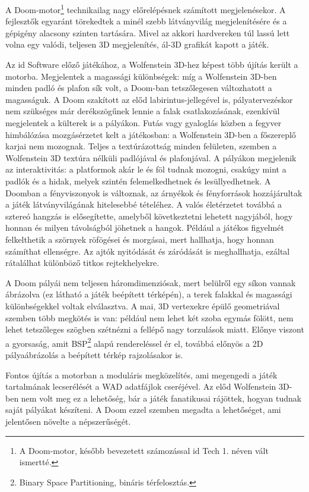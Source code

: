 \documentclass{thesis-ekf}
\theoremstyle{definition}
\theoremstyle{remark}
\begin{document}
A Doom-motor\footnote{A Doom-motor, később bevezetett számozással id Tech 1.
néven vált ismertté.} technikailag nagy előrelépésnek számított megjelenésekor.
A fejlesztők egyaránt törekedtek a minél szebb látványvilág megjelenítésére és a
gépigény alacsony szinten tartására. Mivel az akkori hardvereken túl lassú lett
volna egy valódi, teljesen 3D megjelenítés, ál-3D grafikát kapott a játék.
\cite[A játék motorja]{doomgame}

Az id Software előző játékához, a Wolfenstein 3D-hez képest több újítás került a
motorba. Megjelentek a magassági különbségek: míg a Wolfenstein 3D-ben minden
padló és plafon sík volt, a Doom-ban tetszőlegesen változhatott a magasságuk. A
Doom szakított az előd labirintus-jellegével is, pályatervezéskor nem szükséges
már derékszögűnek lennie a falak csatlakozásának, ezenkívül megjelentek a
külterek is a pályákon. Futás vagy gyaloglás közben a fegyver himbálózása
mozgásérzetet kelt a játékosban: a Wolfenstein 3D-ben a főszereplő karjai nem
mozognak. Teljes a textúrázottság minden felületen, szemben a Wolfenstein 3D
textúra nélküli padlójával és plafonjával. A pályákon megjelenik az
interaktivitás: a platformok akár le és föl tudnak mozogni, csakúgy mint a
padlók és a hidak, melyek szintén felemelkedhetnek és lesüllyedhetnek. A Doomban
a fényviszonyok is változnak, az árnyékok és fényforrások hozzájárultak a játék
látványvilágának hitelesebbé tételéhez. A valós életérzetet továbbá a sztereó
hangzás is elősegítette, amelyből következtetni lehetett nagyjából, hogy honnan
és milyen távolságból jöhetnek a hangok. Például a játékos figyelmét
felkelthetik a szörnyek röfögései és morgásai, mert hallhatja, hogy honnan
számíthat ellenségre. Az ajtók nyitódását és záródását is meghallhatja, ezáltal
rátalálhat különböző titkos rejtekhelyekre. \cite[A játék motorja]{doomgame}

A Doom pályái nem teljesen háromdimenziósak, mert belülről egy síkon vannak
ábrázolva (ez látható a játék beépített térképén), a terek falakkal és
magassági különbségekkel voltak elválasztva. A mai, 3D vertexekre épülő
geometriával szemben több megkötés is van: például nem lehet két szoba egymás
fölött, nem lehet tetszőleges szögben szétnézni a fellépő nagy torzulások miatt.
Előnye viszont a gyorsaság, amit BSP\footnote{Binary Space Partitioning,
bináris térfelosztás.} alapú rendereléssel ér el, továbbá előnyös a 2D
pályaábrázolás a beépített térkép rajzolásakor is.
\cite[A játék motorja]{doomgame}

Fontos újítás a motorban a moduláris megközelítés, ami megengedi a játék
tartalmának lecserélését a WAD adatfájlok cseréjével. Az előd Wolfenstein 3D-ben
nem volt meg ez a lehetőség, bár a játék fanatikusai rájöttek, hogyan tudnak
saját pályákat készíteni. A Doom ezzel szemben megadta a lehetőséget, ami
jelentősen növelte a népszerűségét. \cite[A játék motorja]{doomgame}
\end{document}
